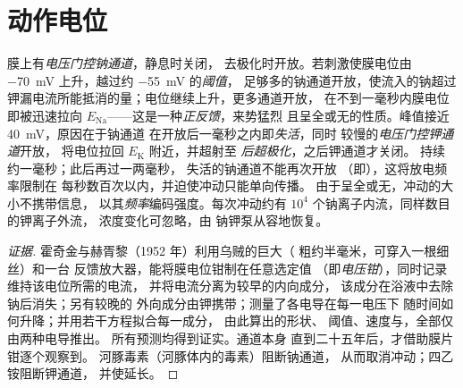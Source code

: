 \section{动作电位}

\begin{proposition}[冲动]\label{prop:b2:neurons-synapses:ap}
膜上有\emph{电压门控钠通道}，静息时关闭，
去极化时开放。若刺激使膜电位由
\qty{-70}{mV} 上升，越过约 \qty{-55}{mV} 的\emph{阈值}，
足够多的钠通道开放，使流入的钠超过
钾漏电流所能抵消的量；电位继续上升，更多通道开放，
在不到一毫秒内膜电位即被迅速拉向
$E_{\mathrm{Na}}$——这是一种\emph{正反馈}，来势猛烈
且呈全或无的性质。峰值接近 \qty{+40}{mV}，原因在于钠通道
在开放后一毫秒之内即\emph{失活}，同时
较慢的\emph{电压门控钾通道}开放，
将电位拉回 $E_{\mathrm K}$ 附近，并超射至
\emph{后超极化}，之后钾通道才关闭。
\emph{}持续约一毫秒；此后再过一两毫秒，
失活的钠通道不能再次开放
（即\emph{}），这将放电频率限制在
每秒数百次以内，并迫使冲动只能单向传播。
由于呈全或无，冲动的大小不携带信息，
以其\emph{频率}编码强度。每次冲动约有
$10^{4}$ 个钠离子内流，同样数目的钾离子外流，
浓度变化可忽略，由
钠钾泵从容地恢复。
\end{proposition}
\begin{proof}[证据]
霍奇金与赫胥黎（1952 年）利用乌贼的巨大（
粗约半毫米，可穿入一根细丝）和一台
反馈放大器，能将膜电位钳制在任意选定值
（即\emph{电压钳}），同时记录维持该电位所需的电流，
并将电流分离为较早的内向成分，
该成分在浴液中去除钠后消失；另有较晚的
外向成分由钾携带；测量了各电导在每一电压下
随时间如何升降；并用若干方程拟合每一成分，
由此算出的形状、
阈值、速度与，全部仅由两种电导推出。
所有预测均得到证实。通道本身
直到二十五年后，才借助膜片钳逐个观察到。
河豚毒素（河豚体内的毒素）阻断钠通道，
从而取消冲动；四乙铵阻断钾通道，
并使延长。
\end{proof}

